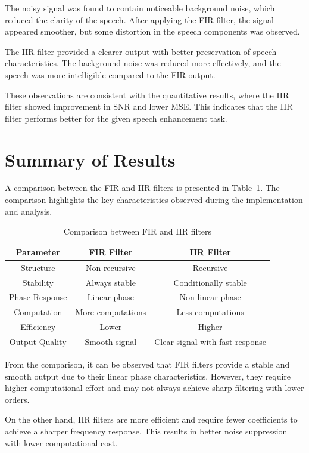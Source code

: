 \documentclass[conference]{IEEEtran}
\begin{document}
The noisy signal was found to contain noticeable background noise, which reduced the clarity of the speech. After applying the FIR filter, the signal appeared smoother, but some distortion in the speech components was observed.

The IIR filter provided a clearer output with better preservation of speech characteristics. The background noise was reduced more effectively, and the speech was more intelligible compared to the FIR output.

These observations are consistent with the quantitative results, where the IIR filter showed improvement in SNR and lower MSE. This indicates that the IIR filter performs better for the given speech enhancement task.

\section{Summary of Results}

A comparison between the FIR and IIR filters is presented in Table~\ref{tab:comparison}. The comparison highlights the key characteristics observed during the implementation and analysis.

\begin{table}[htbp]
\caption{Comparison between FIR and IIR filters}
\centering
\begin{tabular}{|c|c|c|}
\hline
\textbf{Parameter} & \textbf{FIR Filter} & \textbf{IIR Filter} \\
\hline
Structure & Non-recursive & Recursive \\
\hline
Stability & Always stable & Conditionally stable \\
\hline
Phase Response & Linear phase & Non-linear phase \\
\hline
Computation & More computations & Less computations \\
\hline
Efficiency & Lower & Higher \\
\hline
Output Quality & Smooth signal & Clear signal with fast response \\
\hline
\end{tabular}
\label{tab:comparison}
\end{table}

From the comparison, it can be observed that FIR filters provide a stable and smooth output due to their linear phase characteristics. However, they require higher computational effort and may not always achieve sharp filtering with lower orders.

On the other hand, IIR filters are more efficient and require fewer coefficients to achieve a sharper frequency response. This results in better noise suppression with lower computational cost.
\end{document}
